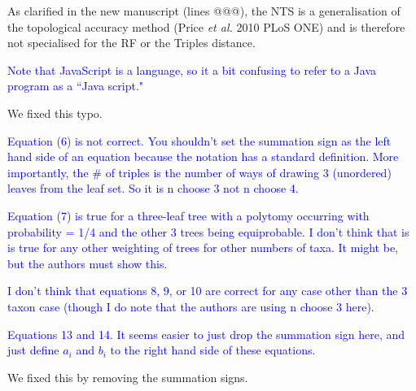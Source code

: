 \documentclass[11pt]{letter}
\begin{document}
\begin{letter}{}
As clarified in the new manuscript (lines @@@), the NTS is a generalisation of the topological accuracy method (Price \textit{et al.} 2010 PLoS ONE) and is therefore not specialised for the RF or the Triples distance.


\textcolor{blue}{Note that JavaScript is a language, so it a bit confusing to refer to a Java program as a ``Java script."}

We fixed this typo.


\textcolor{blue}{Equation (6) is not correct. You shouldn't set the summation sign as the left hand side of an equation because the notation has a standard definition. More importantly, the $\#$ of triples is the number of ways of drawing 3 (unordered) leaves from the leaf set. So it is n choose 3 not n choose 4.}



\textcolor{blue}{Equation (7) is true for a three-leaf tree with a polytomy occurring with probability = 1/4 and the other 3 trees being equiprobable. I don't think that is is true for any other weighting of trees for other numbers of taxa. It might be, but the authors must show this.}



\textcolor{blue}{I don't think that equations 8, 9, or 10 are correct for any case other than the 3 taxon case (though I do note that the authors are using n choose 3 here).}



\textcolor{blue}{Equations 13 and 14. It seems easier to just drop the summation sign here, and just define $a_i$ and $b_i$ to the right hand side of these equations.}

We fixed this by removing the summation signs.


\end{letter}
\end{document}
